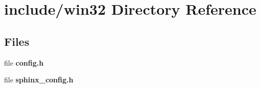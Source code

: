 \section{include/win32 Directory Reference}
\label{dir_626e1d022ece4ed819c63798cf035138}
\subsection*{Files}
\begin{DoxyCompactItemize}
\item 
file {\bfseries config.\-h}
\item 
file {\bfseries sphinx\-\_\-config.\-h}
\end{DoxyCompactItemize}
